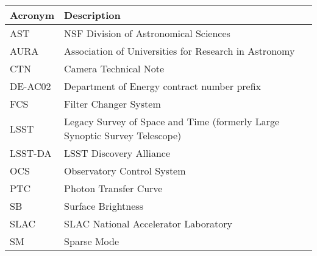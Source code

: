 \addtocounter{table}{-1}
\begin{longtable}{p{}p{}}\hline
\textbf{Acronym} & \textbf{Description}  \\\hline

AST & NSF Division of Astronomical Sciences \\\hline
AURA & Association of Universities for Research in Astronomy \\\hline
CTN & Camera Technical Note \\\hline
DE-AC02 & Department of Energy contract number prefix \\\hline
FCS & Filter Changer System \\\hline
LSST & Legacy Survey of Space and Time (formerly Large Synoptic Survey Telescope) \\\hline
LSST-DA & LSST Discovery Alliance \\\hline
OCS & Observatory Control System \\\hline
PTC & Photon Transfer Curve \\\hline
SB & Surface Brightness \\\hline
SLAC & SLAC National Accelerator Laboratory \\\hline
SM & Sparse Mode \\\hline
\end{longtable}
